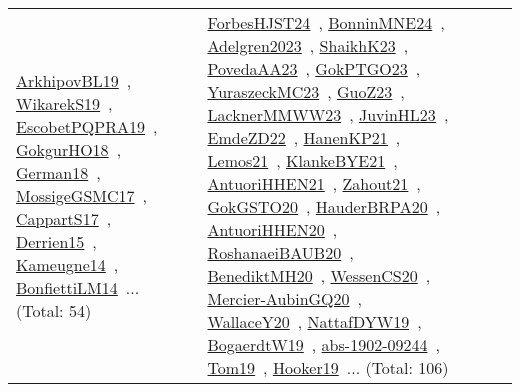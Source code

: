 {\begin{longtable}{lp{3cm}>{\raggedright\arraybackslash}p{6cm}>{\raggedright\arraybackslash}p{6cm}>{\raggedright\arraybackslash}p{8cm}}
\href{../works/ArkhipovBL19.pdf}{ArkhipovBL19}~\cite{ArkhipovBL19}, \href{../works/WikarekS19.pdf}{WikarekS19}~\cite{WikarekS19}, \href{../works/EscobetPQPRA19.pdf}{EscobetPQPRA19}~\cite{EscobetPQPRA19}, \href{../works/GokgurHO18.pdf}{GokgurHO18}~\cite{GokgurHO18}, \href{../works/German18.pdf}{German18}~\cite{German18}, \href{../works/MossigeGSMC17.pdf}{MossigeGSMC17}~\cite{MossigeGSMC17}, \href{../works/CappartS17.pdf}{CappartS17}~\cite{CappartS17}, \href{../works/Derrien15.pdf}{Derrien15}~\cite{Derrien15}, \href{../works/Kameugne14.pdf}{Kameugne14}~\cite{Kameugne14}, \href{../works/BonfiettiLM14.pdf}{BonfiettiLM14}~\cite{BonfiettiLM14}... (Total: 54) & \href{../works/ForbesHJST24.pdf}{ForbesHJST24}~\cite{ForbesHJST24}, \href{../works/BonninMNE24.pdf}{BonninMNE24}~\cite{BonninMNE24}, \href{../works/Adelgren2023.pdf}{Adelgren2023}~\cite{Adelgren2023}, \href{../works/ShaikhK23.pdf}{ShaikhK23}~\cite{ShaikhK23}, \href{../works/PovedaAA23.pdf}{PovedaAA23}~\cite{PovedaAA23}, \href{../works/GokPTGO23.pdf}{GokPTGO23}~\cite{GokPTGO23}, \href{../works/YuraszeckMC23.pdf}{YuraszeckMC23}~\cite{YuraszeckMC23}, \href{../works/GuoZ23.pdf}{GuoZ23}~\cite{GuoZ23}, \href{../works/LacknerMMWW23.pdf}{LacknerMMWW23}~\cite{LacknerMMWW23}, \href{../works/JuvinHL23.pdf}{JuvinHL23}~\cite{JuvinHL23}, \href{../works/EmdeZD22.pdf}{EmdeZD22}~\cite{EmdeZD22}, \href{../works/HanenKP21.pdf}{HanenKP21}~\cite{HanenKP21}, \href{../works/Lemos21.pdf}{Lemos21}~\cite{Lemos21}, \href{../works/KlankeBYE21.pdf}{KlankeBYE21}~\cite{KlankeBYE21}, \href{../works/AntuoriHHEN21.pdf}{AntuoriHHEN21}~\cite{AntuoriHHEN21}, \href{../works/Zahout21.pdf}{Zahout21}~\cite{Zahout21}, \href{../works/GokGSTO20.pdf}{GokGSTO20}~\cite{GokGSTO20}, \href{../works/HauderBRPA20.pdf}{HauderBRPA20}~\cite{HauderBRPA20}, \href{../works/AntuoriHHEN20.pdf}{AntuoriHHEN20}~\cite{AntuoriHHEN20}, \href{../works/RoshanaeiBAUB20.pdf}{RoshanaeiBAUB20}~\cite{RoshanaeiBAUB20}, \href{../works/BenediktMH20.pdf}{BenediktMH20}~\cite{BenediktMH20}, \href{../works/WessenCS20.pdf}{WessenCS20}~\cite{WessenCS20}, \href{../works/Mercier-AubinGQ20.pdf}{Mercier-AubinGQ20}~\cite{Mercier-AubinGQ20}, \href{../works/WallaceY20.pdf}{WallaceY20}~\cite{WallaceY20}, \href{../works/NattafDYW19.pdf}{NattafDYW19}~\cite{NattafDYW19}, \href{../works/BogaerdtW19.pdf}{BogaerdtW19}~\cite{BogaerdtW19}, \href{../works/abs-1902-09244.pdf}{abs-1902-09244}~\cite{abs-1902-09244}, \href{../works/Tom19.pdf}{Tom19}~\cite{Tom19}, \href{../works/Hooker19.pdf}{Hooker19}~\cite{Hooker19}... (Total: 106)\\

\end{longtable}}
